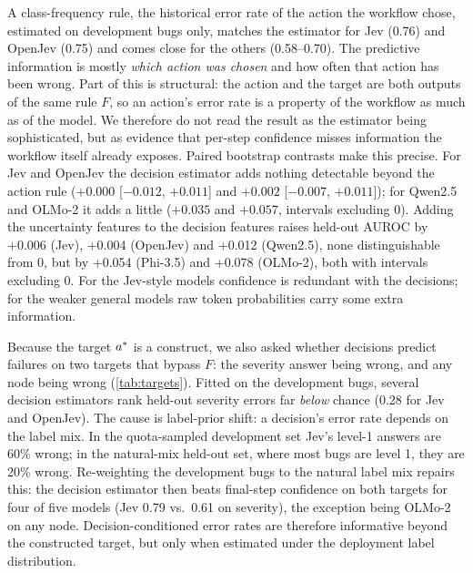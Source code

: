  A class-frequency rule, the historical error
rate of the action the workflow chose, estimated on development bugs only,
matches the estimator for Jev (0.76) and OpenJev (0.75) and comes close
for the others (0.58--0.70). The predictive information is mostly
\emph{which action was chosen} and how often that action has been wrong.
Part of this is structural: the action and the target are both outputs of
the same rule $F$, so an action's error rate is a property of the
workflow as much as of the model. We therefore do not read the result as
the estimator being sophisticated, but as evidence that per-step
confidence misses information the workflow itself already exposes.
Paired bootstrap contrasts make this precise. For Jev and OpenJev the
decision estimator adds nothing detectable beyond the action rule
($+0.000$ [$-0.012$, $+0.011$] and $+0.002$ [$-0.007$, $+0.011$]); for
Qwen2.5 and OLMo-2 it adds a little ($+0.035$ and $+0.057$, intervals
excluding 0). Adding the uncertainty features to the decision features
raises held-out AUROC by +0.006 (Jev), +0.004 (OpenJev) and +0.012
(Qwen2.5), none distinguishable from 0, but by +0.054 (Phi-3.5) and +0.078
(OLMo-2), both with intervals excluding 0. For the Jev-style models
confidence is redundant with the decisions; for the weaker general models
raw token probabilities carry some extra information.

\begin{table}[t]
\centering
\small
\resizebox{\linewidth}{!}{}
\caption{Exploratory: held-out AUROC of the decision-only estimator on two
targets that do not pass through the action rule $F$, fitted on the
quota-sampled development bugs (``dev fit'') or on the same bugs
re-weighted to the natural label mix, against final-step confidence. Bold:
re-weighted estimator above confidence.}
\label{tab:targets}
\end{table}

 Because the target
$a^{*}$ is a construct, we also asked whether decisions predict failures
on two targets that bypass $F$: the severity answer being wrong, and any
node being wrong (\cref{tab:targets}). Fitted on the development bugs,
several decision estimators rank held-out severity errors far \emph{below}
chance (0.28 for Jev and OpenJev). The cause is label-prior shift: a
decision's error rate depends on the label mix. In the quota-sampled
development set Jev's level-1 answers are 60\% wrong; in the natural-mix
held-out set, where most bugs are level 1, they are 20\% wrong. Re-weighting
the development bugs to the natural label mix repairs this: the decision
estimator then beats final-step confidence on both targets for four of
five models (Jev 0.79 vs.\ 0.61 on severity), the exception being OLMo-2
on any node. Decision-conditioned error rates are therefore informative
beyond the constructed target, but only when estimated under the
deployment label distribution.

